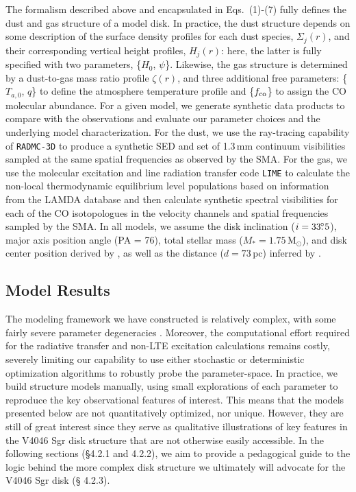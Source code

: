 {The formalism described above and encapsulated in Eqs.~(1)-(7) fully defines the
dust and gas structure of a model disk.  In practice, the dust structure 
depends on some description of the surface density profiles for each dust 
species, $\Sigma_j(r)$, and their corresponding vertical height profiles, 
$H_j(r)$: here, the latter is fully specified with two parameters, \{$H_0$, 
$\psi$\}.  Likewise, the gas structure is determined by a dust-to-gas mass ratio
profile $\zeta(r)$, and three additional free parameters: \{$T_{a,0}$, $q$\} to 
define the atmosphere temperature profile and \{$f_{\rm co}$\} to assign the CO 
molecular abundance.  For a given model, we generate synthetic data products to 
compare with the observations and evaluate our parameter choices and the 
underlying model characterization.  For the dust, we use the ray-tracing 
capability of {\tt RADMC-3D} to produce a synthetic SED and set of 1.3\,mm
continuum visibilities sampled at the same spatial frequencies as observed by
the SMA.  For the gas, we use the molecular excitation and line radiation 
transfer code {\tt LIME} \citep{brinch10} to calculate the non-local 
thermodynamic equilibrium level populations based on information from the LAMDA
database \citep{schoier05} and then calculate synthetic spectral visibilities
for each of the CO isotopologues in the velocity channels and spatial 
frequencies sampled by the SMA.  In all models, we assume the disk inclination
($i = 33\mbox{$.\!\!^\circ$}5$), major axis position angle (PA = 76\degr), total stellar mass
($M_{\ast} = 1.75$\,M$_{\odot}$), and disk center position derived by
\citet{rosenfeld12}, as well as the distance ($d = 73$\,pc) inferred by
\citet{torres06,torres08}.


\subsection{Model Results}

The modeling framework we have constructed is relatively complex, with some
fairly severe parameter degeneracies \citep[for a more detailed discussion,
see][]{andrews09,andrews11,andrews12,qi11}.  Moreover, the computational
effort required for the radiative transfer and non-LTE excitation calculations
remains costly, severely limiting our capability to use either stochastic or
deterministic optimization algorithms to robustly probe the parameter-space.
In practice, we build structure models manually, using small explorations of
each parameter to reproduce the key observational features of interest.  This
means that the models presented below are not quantitatively optimized, nor
unique.  However, they are still of great interest since they serve as
qualitative illustrations of key features in the V4046 Sgr disk structure that
are not otherwise easily accessible.  In the following sections (\S 4.2.1 and
4.2.2), we aim to provide a pedagogical guide to the logic behind the more
complex disk structure we ultimately will advocate for the V4046 Sgr disk (\S
4.2.3).


}
